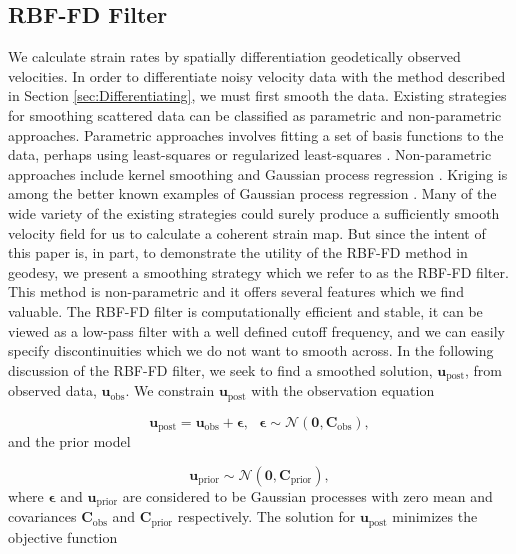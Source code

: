 \documentclass[10pt,a4paper]{article}
\begin{document}
\subsection{RBF-FD Filter}\label{sec:Filter}
We calculate strain rates by spatially differentiation geodetically observed velocities.  In order to differentiate noisy velocity data with the method described in Section \ref{sec:Differentiating}, we must first smooth the data. Existing strategies for smoothing scattered data can be classified as parametric and non-parametric approaches.  Parametric approaches involves fitting a set of basis functions to the data, perhaps using least-squares or regularized least-squares \citep[e.g.][]{Fasshauer2007}. Non-parametric approaches include kernel smoothing \citep[e.g.][]{Hastie1990} and Gaussian process regression \citep[e.g.][]{Rasmussen2006}. Kriging is among the better known examples of Gaussian process regression \citep{Matheron1963}.  Many of the wide variety of the existing strategies could surely produce a sufficiently smooth velocity field for us to calculate a coherent strain map. But since the intent of this paper is, in part, to demonstrate the utility of the RBF-FD method in geodesy, we present a smoothing strategy which we refer to as the RBF-FD filter.  This method is non-parametric and it offers several features which we find valuable.  The RBF-FD filter is computationally efficient and stable, it can be viewed as a low-pass filter with a well defined cutoff frequency, and we can easily specify discontinuities which we do not want to smooth across. In the following discussion of the RBF-FD filter, we seek to find a smoothed solution, $\mathbf{u}_\mathrm{post}$, from observed data, $\mathbf{u}_\mathrm{obs}$. We constrain $\mathbf{u}_\mathrm{post}$ with the observation equation

\begin{equation}\label{eq:Data}
  \mathbf{u}_\mathrm{post} = \mathbf{u}_\mathrm{obs} + \mathbf{\epsilon},\ \ \ \mathbf{\epsilon} \sim \mathcal{N}(\mathbf{0},\mathbf{C}_\mathrm{obs}),
\end{equation}
and the prior model

\begin{equation}\label{eq:Prior}
  \mathbf{u}_\mathrm{prior} \sim \mathcal{N}(\mathbf{0},\mathbf{C}_\mathrm{prior}),
\end{equation}
where $\mathbf{\epsilon}$ and $\mathbf{u}_\mathrm{prior}$ are considered to be Gaussian processes with zero mean and covariances $\mathbf{C}_\mathrm{obs}$ and $\mathbf{C}_\mathrm{prior}$ respectively.  The solution for $\mathbf{u}_\mathrm{post}$ minimizes the objective function  
\end{document}
